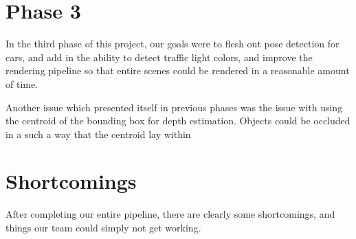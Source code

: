\section{Phase 3}
In the third phase of this project, our goals were to flesh out pose detection for cars, and add in the ability to detect traffic light colors, and improve the rendering pipeline so that entire scenes could be rendered in a reasonable amount of time.

Another issue which presented itself in previous phases was the issue with using the centroid of the bounding box for depth estimation. Objects could be occluded in a such a way that the centroid lay within



\section{Shortcomings}
After completing our entire pipeline, there are clearly some shortcomings, and things our team could simply not get working.